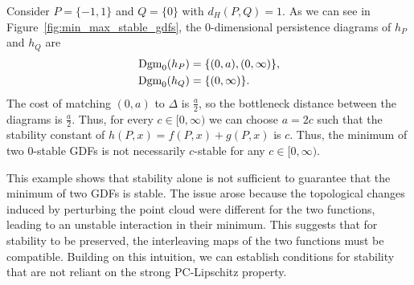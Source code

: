 \begin{example}
    Consider $P = \{-1, 1\}$ and $Q = \{0\}$ with $d_H(P, Q) = 1$.
    As we can see in Figure~\ref{fig:min_max_stable_gdfs}, the 0-dimensional
    persistence diagrams of $h_P$ and $h_Q$ are
    \begin{align}
        \operatorname{Dgm}_0(h_P) &= \{(0, a), (0, \infty)\}, \\
        \operatorname{Dgm}_0(h_Q) &= \{(0, \infty)\}.
    \end{align}
    The cost of matching $(0, a)$ to $\Delta$ is $\frac{a}{2}$, so the
    bottleneck distance between the diagrams is $\frac{a}{2}$.
    Thus, for every $c \in [0, \infty)$ we can choose $a = 2c$ such that
    the stability constant of $h(P, x) = f(P, x) + g(P, x)$ is $c$.
    Thus, the minimum of two $0$-stable GDFs is not necessarily
    $c$-stable for any $c \in [0, \infty)$.
\end{example}

This example shows that stability alone is not sufficient to guarantee that the
minimum of two GDFs is stable. The issue arose because the topological changes
induced by perturbing the point cloud were different for the two functions,
leading to an unstable interaction in their minimum. This suggests that for
stability to be preserved, the interleaving maps of the two functions must be
compatible. Building on this intuition, we can establish conditions for
stability that are not reliant on the strong PC-Lipschitz property.

